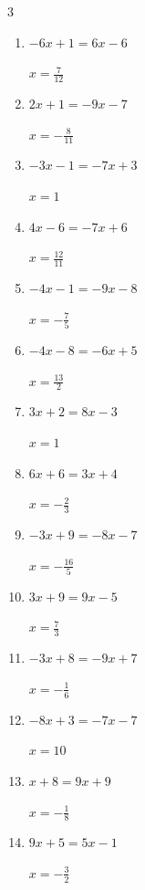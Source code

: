 \begin{multicols}{3}
\begin{enumerate}
        $\displaystyle x=\frac{9}{7}$

  \item $-6x+1=6x-6$

        $\displaystyle x=\frac{7}{12}$

  \item $2x+1=-9x-7$

        $\displaystyle x=-\frac{8}{11}$

  \item $-3x-1=-7x+3$

        $\displaystyle x=1$

  \item $4x-6=-7x+6$

        $\displaystyle x=\frac{12}{11}$

  \item $-4x-1=-9x-8$

        $\displaystyle x=-\frac{7}{5}$

  \item $-4x-8=-6x+5$

        $\displaystyle x=\frac{13}{2}$

\columnbreak %

  \item $3x+2=8x-3$

        $\displaystyle x=1$

  \item $6x+6=3x+4$

        $\displaystyle x=-\frac{2}{3}$

  \item $-3x+9=-8x-7$

        $\displaystyle x=-\frac{16}{5}$

  \item $3x+9=9x-5$

        $\displaystyle x=\frac{7}{3}$

  \item $-3x+8=-9x+7$

        $\displaystyle x=-\frac{1}{6}$

  \item $-8x+3=-7x-7$

        $\displaystyle x=10$

  \item $x+8=9x+9$

        $\displaystyle x=-\frac{1}{8}$

  \item $9x+5=5x-1$

        $\displaystyle x=-\frac{3}{2}$


\end{enumerate}
\end{multicols}
